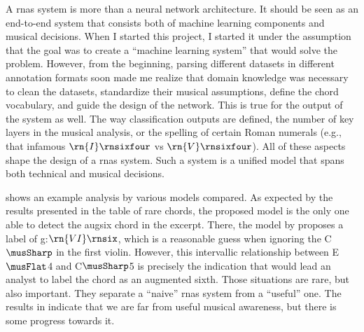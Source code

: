 
A \glspl{rna} system is more than a neural network
architecture. It should be seen as an end-to-end system that
consists both of machine learning components and musical
decisions. When I started this project, I started it under
the assumption that the goal was to create a ``machine
learning system'' that would solve the problem. However,
from the beginning, parsing different datasets in different
annotation formats soon made me realize that domain
knowledge was necessary to clean the datasets, standardize
their musical assumptions, define the chord vocabulary, and
guide the design of the network. This is true for the output
of the system as well. The way classification outputs are
defined, the number of key layers in the musical analysis,
or the spelling of certain Roman numerals (e.g., that
infamous $\rn{I}\rnsixfour$ vs $\rn{V}\rnsixfour$). All of
these aspects shape the design of a \glspl{rna} system. Such
a system is a unified model that spans both technical and
musical decisions.

 shows an example analysis by
various models compared. As expected by the results
presented in the table of rare chords, the proposed model is
the only one able to detect the \gls{augsix} chord in the
excerpt. There, the model by \textcite{mcleod2021modular}
proposes a label of g:$\rn{VI}\rnsix$, which is a reasonable
guess when ignoring the C$\musSharp$ in the first violin.
However, this intervallic relationship between E$\musFlat$4
and C$\musSharp$5 is precisely the indication that would
lead an analyst to label the chord as an augmented sixth.
Those situations are rare, but also important. They separate
a ``naive'' \glspl{rna} system from a ``useful'' one. The
results in  indicate that we are far
from useful musical awareness, but there is some progress
towards it.

